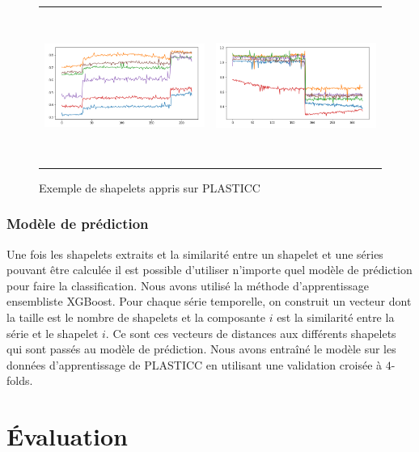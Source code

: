 \begin{figure}[!h]
    \centering
    \begin{tabular}{c|c}
         \includegraphics[width=7cm,height=5cm]{report/figures/shapelet.png} & \includegraphics[width=7cm,height=5cm]{report/figures/shapelet2.png}
    \end{tabular}
    \caption{Exemple de shapelets appris sur PLASTICC}
    \label{fig:shapelet_example}
\end{figure}

\subsubsection{Modèle de prédiction}
Une fois les shapelets extraits et la similarité entre un shapelet et une séries pouvant être calculée il est possible d'utiliser n'importe quel modèle de prédiction pour faire la classification. Nous avons utilisé la méthode d'apprentissage ensembliste XGBoost\cite{chen2016xgboost}. Pour chaque série temporelle, on construit un vecteur dont la taille est le nombre de shapelets et la composante $ i $ est la similarité entre la série et le shapelet $ i $. Ce sont ces vecteurs de distances aux différents shapelets qui sont passés au modèle de prédiction. Nous avons entraîné le modèle sur les données d'apprentissage de PLASTICC en utilisant une validation croisée à $ 4 $-folds.

\section{Évaluation}

